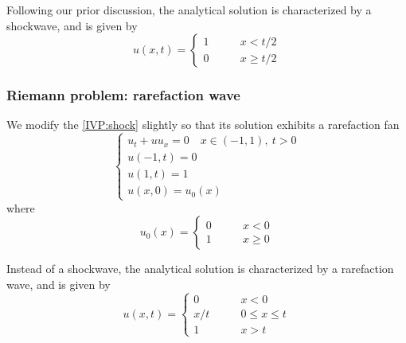 \documentclass{myproject}
\begin{document}
Following our prior discussion, the analytical solution is characterized by a shockwave, and is given by
\begin{equation}
    u(x,t) = \begin{cases}
        1 \qquad & x < t/2 \\
        0 \qquad & x \geq t/2
    \end{cases}
\end{equation}

\subsubsection{Riemann problem: rarefaction wave}

We modify the \eqref{IVP:shock} slightly so that its solution exhibits a rarefaction fan
\begin{equation}\label{IVP:shock}
    \begin{cases}
        u_t + uu_x = 0 \quad x \in (-1,1), \: t > 0 \\
        u(-1,t) = 0 \\
        u(1,t) = 1 \\
        u(x,0) = u_0(x)
    \end{cases} 
\end{equation}
where 
\begin{equation}
    u_0(x) = \begin{cases}
        0 \qquad & x < 0 \\
        1 \qquad & x \geq 0
    \end{cases}
\end{equation}

Instead of a shockwave, the analytical solution is characterized by a rarefaction wave, and is given by
\begin{equation}
    u(x,t) = \begin{cases}
        0 \qquad & x < 0 \\
        x/t \qquad & 0 \leq x \leq t \\
        1 \qquad & x > t
    \end{cases}
\end{equation}
\end{document}
